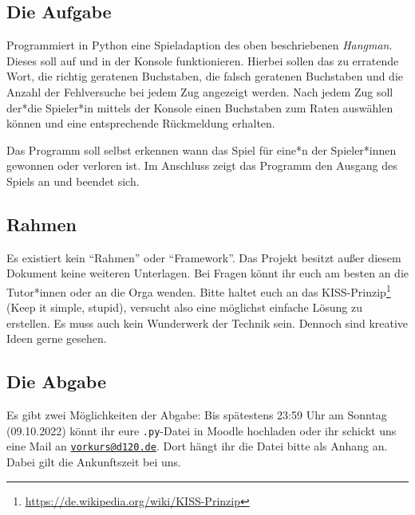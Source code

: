 \documentclass[ngerman,accentcolor=3c,colorbacktitle,12pt]{tudaexercise}
\begin{document}
\subsection*{Die Aufgabe}
Programmiert in Python eine Spieladaption des oben beschriebenen \emph{Hangman}.
Dieses soll auf und in der Konsole funktionieren.
Hierbei sollen das zu erratende Wort, die richtig geratenen Buchstaben, die falsch geratenen Buchstaben und die Anzahl der Fehlversuche bei jedem Zug angezeigt werden.
Nach jedem Zug soll der*die Spieler*in mittels der Konsole einen Buchstaben zum Raten auswählen können und eine entsprechende Rückmeldung erhalten.

Das Programm soll selbst erkennen wann das Spiel für eine*n der Spieler*innen gewonnen oder verloren ist.
Im Anschluss zeigt das Programm den Ausgang des Spiels an und beendet sich.

\clearpage
\subsection*{Rahmen}
Es existiert kein \enquote{Rahmen} oder \enquote{Framework}.
Das Projekt besitzt außer diesem Dokument keine weiteren Unterlagen.
Bei Fragen könnt ihr euch am besten an die Tutor*innen oder an die Orga wenden.
Bitte haltet euch an das KISS-Prinzip\footnote[2]{\url{https://de.wikipedia.org/wiki/KISS-Prinzip}} (Keep it simple, stupid), versucht also eine möglichst einfache Lösung zu erstellen.
Es muss auch kein Wunderwerk der Technik sein.
Dennoch sind kreative Ideen gerne gesehen.

\subsection*{Die Abgabe}
Es gibt zwei Möglichkeiten der Abgabe: Bis spätestens 23:59 Uhr am Sonntag (09.10.2022) könnt ihr eure \texttt{.py}-Datei in Moodle hochladen oder ihr schickt uns eine Mail an \href{mailto:vorkurs@d120.de}{\nolinkurl{vorkurs@d120.de}}.
Dort hängt ihr die Datei bitte als Anhang an.
Dabei gilt die Ankunftszeit bei uns.
\end{document}
